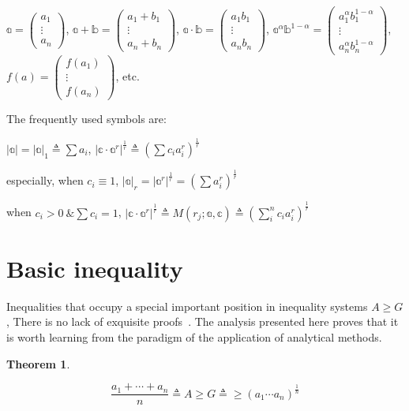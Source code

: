 \documentclass[12pt,a4paper,reqno]{amsart}
\theoremstyle{plain}
\newtheorem{Th}{Theorem}
\theoremstyle{definition}
\begin{document}
$\mathbb{a}=\left( \begin{array}{c} a_1 \\ \vdots \\ a_n \end{array} \right)$, 
$\mathbb{a} + \mathbb{b} = \left( \begin{array}{c} a_1 + b_1 \\ \vdots \\ a_n + b_n \end{array} \right)$,
$\mathbb{a} \cdot \mathbb{b} = \left( \begin{array}{c} a_1 b_1 \\ \vdots \\ a_n b_n \end{array} \right)$, 
$\mathbb{a}^{\alpha} \mathbb{b}^{1-\alpha} = \left( \begin{array}{c} a_1^{\alpha} b_1^{1-\alpha} \\ \vdots \\ a_n^{\alpha} b_n^{1-\alpha} \end{array} \right)$, 
$f(a)=\left( \begin{array}{c} f(a_1) \\ \vdots \\ f(a_n) \end{array} \right)$, etc. 

The frequently used symbols are:

$|\mathbb{a}| = |\mathbb{a}|_1 \triangleq \sum{a_i}$, $|\mathbb{c}\cdot \mathbb{a}^r|^{\frac{1}{r}}  \triangleq \left( \sum{c_i a_i^r}\right)^{\frac{1}{r}}$

especially, when $c_i \equiv 1$, $|\mathbb{a}|_r = |\mathbb{a}^r|^{\frac{1}{r}} = \left( \sum{a_i^r}\right)^{\frac{1}{r}}$

when $c_i > 0 ~\& \sum{c_i} = 1$, $|\mathbb{c}\cdot \mathbb{a}^r|^{\frac{1}{r}}\triangleq M(r_j;\mathbb{a}, \mathbb{c}) \triangleq (\sum_{i}^{n}c_i a_i^r)^{\frac{1}{r}}$ 


\section{Basic inequality}

Inequalities that occupy a special important position in inequality systems $A\geqslant G$, There is no lack of exquisite proofs~\cite{shi1964}. The analysis presented here proves that it is worth learning from the paradigm of the application of analytical methods. 


\begin{Th} \label{th1} 

\begin{equation}
  \frac{a_1 + \cdots +a_n}{n} \triangleq A \geqslant G \triangleq \geqslant (a_1 \cdots a_n)^{\frac{1}{n}}
\end{equation}

\end{Th}
\end{document}

